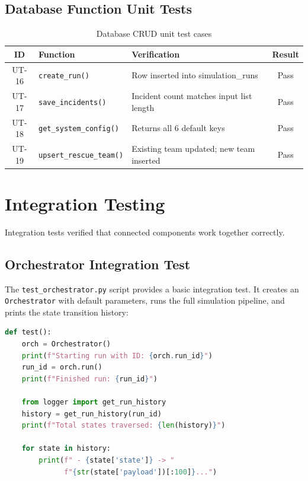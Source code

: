 \subsection{Database Function Unit Tests}

\begin{table}[H]
\centering
\caption{Database CRUD unit test cases}
\label{tab:unit_db}
\begin{tabularx}{\textwidth}{|c|X|X|c|}
\hline
\textbf{ID} & \textbf{Function} & \textbf{Verification} & \textbf{Result} \\
\hline
UT-16 & \texttt{create\_run()} & Row inserted into simulation\_runs & Pass \\
\hline
UT-17 & \texttt{save\_incidents()} & Incident count matches input list length & Pass \\
\hline
UT-18 & \texttt{get\_system\_config()} & Returns all 6 default keys & Pass \\
\hline
UT-19 & \texttt{upsert\_rescue\_team()} & Existing team updated; new team inserted & Pass \\
\hline
\end{tabularx}
\end{table}

\section{Integration Testing}
\label{sec:integration_testing}

Integration tests verified that connected components work together correctly.

\subsection{Orchestrator Integration Test}

The \texttt{test\_orchestrator.py} script provides a basic integration test. It creates an \texttt{Orchestrator} with default parameters, runs the full simulation pipeline, and prints the state transition history:

\begin{lstlisting}[style=codestyle, language=Python, caption=Orchestrator integration test]
def test():
    orch = Orchestrator()
    print(f"Starting run with ID: {orch.run_id}")
    run_id = orch.run()
    print(f"Finished run: {run_id}")
    
    from logger import get_run_history
    history = get_run_history(run_id)
    print(f"Total states traversed: {len(history)}")
    
    for state in history:
        print(f" - {state['state']} -> "
              f"{str(state['payload'])[:100]}...")
\end{lstlisting}

